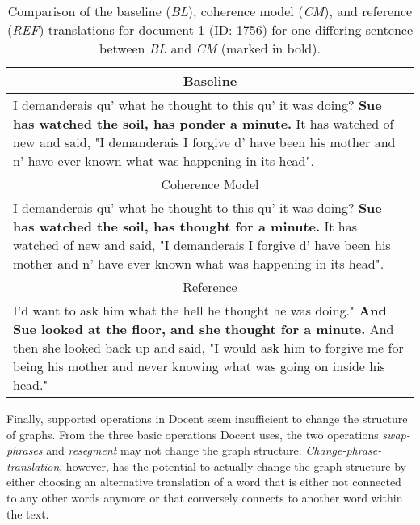 \begin{table}[!ht]
\centering
\small 
\begin{tabular}{p{}}
\hline
\multicolumn{1}{c}{Baseline}
\\\hline
I demanderais qu' what he thought to this qu' it was doing? \textbf{Sue has watched the soil, has ponder a minute.} It has watched of new and said, "I demanderais I forgive d' have been his mother and n' have ever known what was happening in its head".\\\hline
\multicolumn{1}{c}{Coherence Model}
\\\hline    
I demanderais qu' what he thought to this qu' it was doing? \textbf{Sue has watched the soil, has thought for a minute.} It has watched of new and said, "I demanderais I forgive d' have been his mother and n' have ever known what was happening in its head".\\\hline
\multicolumn{1}{c}{Reference} \\\hline
I'd want to ask him what the hell he thought he was doing." \textbf{And Sue looked at the floor, and she thought for a minute.} And then she looked back up and said, "I would ask him to forgive me for being his mother and never knowing what was going on inside his head."
\\\hline
\end{tabular}

\caption{Comparison of the baseline (\textit{BL}), coherence model (\textit{CM}), and reference (\textit{REF}) translations for document 1 (ID: 1756) for one differing sentence between \textit{BL} and \textit{CM} (marked in bold).}
\label{tab:translatedtext}
\end{table}

Finally, supported operations in Docent seem insufficient to change the structure of graphs. From the three basic operations Docent uses, the two operations \textit{swap-phrases} and \textit{resegment} may not change the graph structure. \textit{Change-phrase-translation}, however, has the potential to actually change the graph structure by either choosing an alternative translation of a word that is either not connected to any other words anymore or that conversely connects to another word within the text. 

